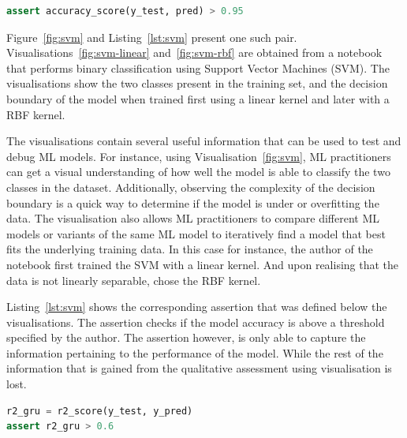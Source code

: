 \documentclass[conference]{IEEEtran}
\begin{document}
\begin{lstlisting}[language=Python, caption={Assertion on the accuracy of the ML model.}, label={lst:svm}]
assert accuracy_score(y_test, pred) > 0.95
\end{lstlisting}

Figure~\ref{fig:svm} and Listing~\ref{lst:svm} present one such pair. Visualisations~\ref{fig:svm-linear} and~\ref{fig:svm-rbf} are obtained from a notebook that performs binary classification using Support Vector Machines (SVM). The visualisations show the two classes present in the training set, and the decision boundary of the model when trained first using a linear kernel and later with a RBF kernel.

The visualisations contain several useful information that can be used to test and debug ML models. For instance, using Visualisation~\ref{fig:svm}, ML practitioners can get a visual understanding of how well the model is able to classify the two classes in the dataset. Additionally, observing the complexity of the decision boundary is a quick way to determine if the model is under or overfitting the data. The visualisation also allows ML practitioners to compare different ML models or variants of the same ML model to iteratively find a model that best fits the underlying training data. In this case for instance, the author of the notebook first trained the SVM with a linear kernel. And upon realising that the data is not linearly separable, chose the RBF kernel.

Listing~\ref{lst:svm} shows the corresponding assertion that was defined below the visualisations. The assertion checks if the model accuracy is above a threshold specified by the author. The assertion however, is only able to capture the information pertaining to the performance of the model. While the rest of the information that is gained from the qualitative assessment using visualisation is lost.

\begin{lstlisting}[language=Python, caption={Assertion to check that the Coefficient of Determination ($R^2$) is higher than the specified threshold.}, label={lst:r2}]
r2_gru = r2_score(y_test, y_pred)
assert r2_gru > 0.6
\end{lstlisting}
\end{document}
